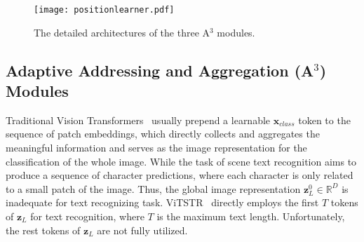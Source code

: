 \documentclass[runningheads]{llncs}
\begin{document}
\begin{figure}[t]\centering
 \texttt{[image: positionlearner.pdf]}
 \caption{The detailed architectures of the three A$^3$ modules. }
 \label{fig:token}
\end{figure}

\subsection{ Adaptive Addressing and Aggregation (A$^3$) Modules} \label{sec:token}

Traditional Vision Transformers~\cite{dosovitskiy2020image,deit} usually prepend a learnable $\mathbf{x}_{class}$ token to the sequence of patch embeddings, which directly collects and aggregates the meaningful information and serves as the image representation for the classification of the whole image.
While the task of scene text recognition aims to produce a sequence of character predictions, where each character is only related to a small patch of the image.
Thus, the global image representation $ \mathbf{z}_{L}^0 \in \mathbb{R}^{ D } $  is inadequate for text recognizing task.
ViTSTR~\cite{ViTSTR} directly employs the first $T$ tokens of  $ \mathbf{z}_{L} $ for text recognition, where  $T$ is the maximum text length. Unfortunately, the rest tokens of $ \mathbf{z}_{L} $ are not fully utilized.
\end{document}
